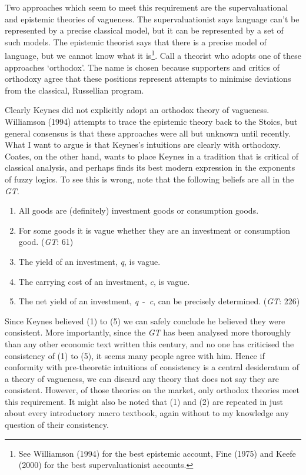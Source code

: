 \documentclass[noflushend]{philosophersimprint}
\begin{document}
Two approaches which seem to meet this requirement are the
supervaluational and epistemic theories of vagueness. The
supervaluationist says language can't be represented by a precise
classical model, but it can be represented by a set of such models. The
epistemic theorist says that there is a precise model of language, but
we cannot know what it is\footnote{See Williamson (1994) for the best
  epistemic account, Fine (1975) and Keefe (2000) for the best
  supervaluationist accounts.}. Call a theorist who adopts one of these
approaches `orthodox'. The name is chosen because supporters and critics
of orthodoxy agree that these positions represent attempts to minimise
deviations from the classical, Russellian program.

Clearly Keynes did not explicitly adopt an orthodox theory of vagueness.
Williamson (1994) attempts to trace the epistemic theory back to the
Stoics, but general consensus is that these approaches were all but
unknown until recently. What I want to argue is that Keynes's intuitions
are clearly with orthodoxy. Coates, on the other hand, wants to place
Keynes in a tradition that is critical of classical analysis, and
perhaps finds its best modern expression in the exponents of fuzzy
logics. To see this is wrong, note that the following beliefs are all in
the \emph{GT}.

\begin{enumerate}
\def\labelenumi{\arabic{enumi}.}
\item
  All goods are (definitely) investment goods or consumption goods.
\item
  For some goods it is vague whether they are an investment or
  consumption good. (\emph{GT}: 61)
\item
  The yield of an investment, \emph{q}, is vague.
\item
  The carrying cost of an investment, \emph{c}, is vague.
\item
  The net yield of an investment, \emph{q}~-~\emph{c}, can be precisely
  determined. (\emph{GT}: 226)
\end{enumerate}

Since Keynes believed (1) to (5) we can safely conclude he believed they
were consistent. More importantly, since the \emph{GT} has been analysed
more thoroughly than any other economic text written this century, and
no one has criticised the consistency of (1) to (5), it seems many
people agree with him. Hence if conformity with pre-theoretic intuitions
of consistency is a central desideratum of a theory of vagueness, we can
discard any theory that does not say they are consistent. However, of
those theories on the market, only orthodox theories meet this
requirement. It might also be noted that (1) and (2) are repeated in
just about every introductory macro textbook, again without to my
knowledge any question of their consistency.
\end{document}

